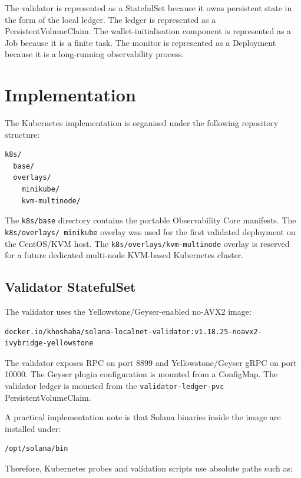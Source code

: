 \documentclass[11pt,a4paper]{article}
\begin{document}
The validator is represented as a StatefulSet because it owns persistent state in the form of the local ledger. The ledger is represented as a PersistentVolumeClaim. The wallet-initialisation component is represented as a Job because it is a finite task. The monitor is represented as a Deployment because it is a long-running observability process.

\section{Implementation}

The Kubernetes implementation is organised under the following repository structure:

\begin{lstlisting}[style=terminal]
k8s/
  base/
  overlays/
    minikube/
    kvm-multinode/
\end{lstlisting}

The \texttt{k8s/base} directory contains the portable Observability Core manifests. The \texttt{k8s/overlays/ minikube} overlay was used for the first validated deployment on the CentOS/KVM host. The \texttt{k8s/overlays/kvm-multinode} overlay is reserved for a future dedicated multi-node KVM-based Kubernetes cluster.

\subsection{Validator StatefulSet}

The validator uses the Yellowstone/Geyser-enabled no-AVX2 image:

\begin{lstlisting}[style=terminal]
docker.io/khoshaba/solana-localnet-validator:v1.18.25-noavx2-ivybridge-yellowstone
\end{lstlisting}

The validator exposes RPC on port 8899 and Yellowstone/Geyser gRPC on port 10000. The Geyser plugin configuration is mounted from a ConfigMap. The validator ledger is mounted from the \texttt{validator-ledger-pvc} PersistentVolumeClaim.

A practical implementation note is that Solana binaries inside the image are installed under:

\begin{lstlisting}[style=terminal]
/opt/solana/bin
\end{lstlisting}

Therefore, Kubernetes probes and validation scripts use absolute paths such as:
\end{document}
